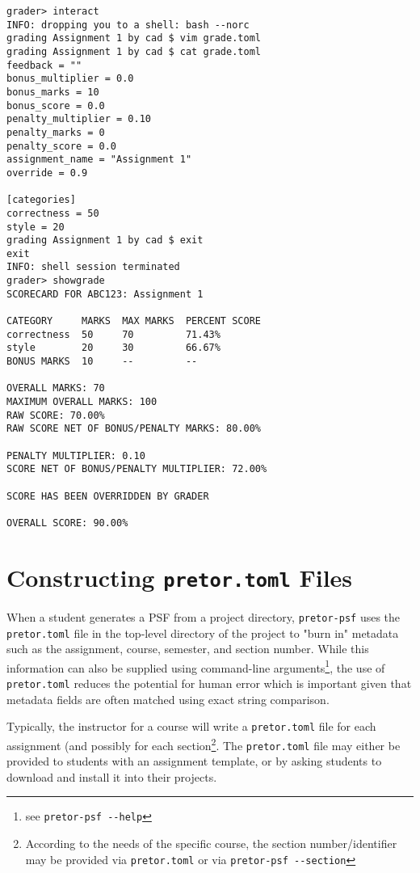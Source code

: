 \documentclass{book}
\begin{document}
\begin{verbatim}
grader> interact
INFO: dropping you to a shell: bash --norc
grading Assignment 1 by cad $ vim grade.toml
grading Assignment 1 by cad $ cat grade.toml
feedback = ""
bonus_multiplier = 0.0
bonus_marks = 10
bonus_score = 0.0
penalty_multiplier = 0.10
penalty_marks = 0
penalty_score = 0.0
assignment_name = "Assignment 1"
override = 0.9

[categories]
correctness = 50
style = 20
grading Assignment 1 by cad $ exit
exit
INFO: shell session terminated
grader> showgrade
SCORECARD FOR ABC123: Assignment 1

CATEGORY     MARKS  MAX MARKS  PERCENT SCORE
correctness  50     70         71.43%
style        20     30         66.67%
BONUS MARKS  10     --         --

OVERALL MARKS: 70
MAXIMUM OVERALL MARKS: 100
RAW SCORE: 70.00%
RAW SCORE NET OF BONUS/PENALTY MARKS: 80.00%

PENALTY MULTIPLIER: 0.10
SCORE NET OF BONUS/PENALTY MULTIPLIER: 72.00%

SCORE HAS BEEN OVERRIDDEN BY GRADER

OVERALL SCORE: 90.00%
\end{verbatim}

\section{Constructing \texttt{pretor.toml} Files}

When a student generates a PSF from a project directory, \texttt{pretor-psf}
uses the \texttt{pretor.toml} file in the top-level directory of the project to
"burn in" metadata such as the assignment, course, semester, and section
number. While this information can also be supplied using command-line
arguments\footnote{see \texttt{pretor-psf -{}-help}}, the use of
\texttt{pretor.toml} reduces the potential for human error which is important
given that metadata fields are often matched using exact string comparison.

Typically, the instructor for a course will write a \texttt{pretor.toml} file
for each assignment (and possibly for each section\footnote{According to the
needs of the specific course, the section number/identifier may be provided via
\texttt{pretor.toml} or via \texttt{pretor-psf -{}-section}}. The
\texttt{pretor.toml} file may either be provided to students with an assignment
template, or by asking students to download and install it into their projects.
\end{document}
